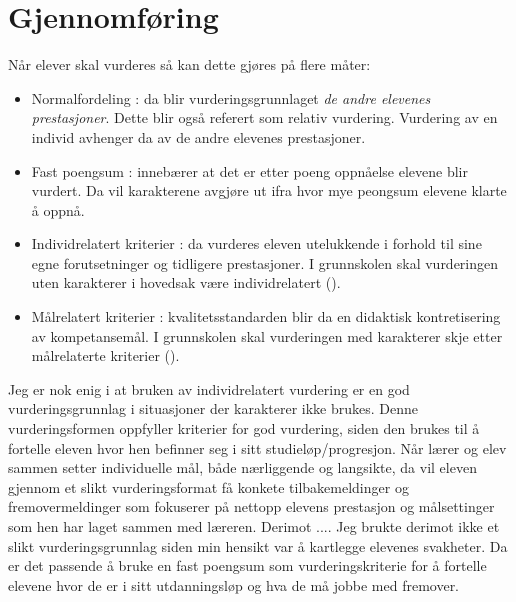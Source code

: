 \documentclass[main.tex]{subfiles}
\begin{document}
\section*{Gjennomføring}
\label{sec:3}
Når elever skal vurderes så kan dette gjøres på flere måter:
\begin{itemize}
\item Normalfordeling : da blir vurderingsgrunnlaget \emph{de andre elevenes prestasjoner}. 
Dette blir også referert som relativ vurdering. Vurdering av en individ avhenger da av de andre
elevenes prestasjoner.
\item Fast poengsum : innebærer at det er etter poeng oppnåelse elevene blir vurdert. Da vil
karakterene avgjøre ut ifra hvor mye peongsum elevene klarte å oppnå.
\item Individrelatert kriterier : da vurderes eleven utelukkende i forhold til sine egne forutsetninger
og tidligere prestasjoner. I grunnskolen skal vurderingen uten karakterer i hovedsak være 
individrelatert  ().
\item Målrelatert kriterier : kvalitetsstandarden blir da en didaktisk kontretisering av kompetansemål.
 I grunnskolen skal vurderingen med karakterer skje etter målrelaterte kriterier ().
\end{itemize}
Jeg er nok enig i at bruken av individrelatert vurdering er en god vurderingsgrunnlag i situasjoner
der karakterer ikke brukes. Denne vurderingsformen oppfyller kriterier for god vurdering,
siden den brukes til å fortelle eleven hvor hen befinner seg i sitt studieløp/progresjon.
Når lærer og elev sammen setter individuelle mål, både nærliggende og langsikte, da vil eleven
gjennom et slikt vurderingsformat få konkete tilbakemeldinger og fremovermeldinger som 
fokuserer på nettopp elevens prestasjon og målsettinger som hen har laget sammen med
læreren. Derimot ....
\newline
\newline
Jeg brukte derimot ikke et slikt vurderingsgrunnlag siden min hensikt var å kartlegge elevenes
svakheter. Da er det passende å bruke en fast poengsum som vurderingskriterie for å 
fortelle elevene hvor de er i sitt utdanningsløp og hva de må jobbe med fremover. 
\end{document}
